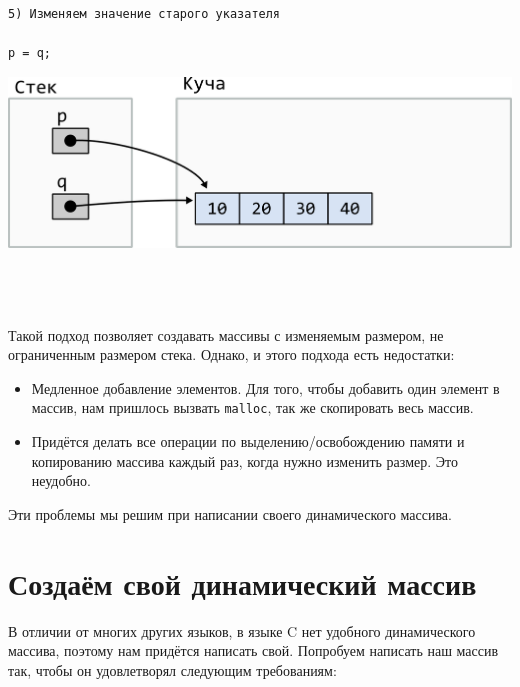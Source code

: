 \documentclass{article}
\begin{document}
\noindent\begin{minipage}{.45\textwidth}
\begin{lstlisting}
5) Изменяем значение старого указателя

p = q;
\end{lstlisting}
\end{minipage}
\begin{minipage}{.45\textwidth}
\includegraphics[scale=0.75]{../images/malloc_realocation5.png}
\end{minipage}
\quad\\
\quad\\
\quad\\

Такой подход позволяет создавать массивы с изменяемым размером, не ограниченным размером стека.
Однако, и этого подхода есть недостатки:
\begin{itemize}
\item Медленное добавление элементов. Для того, чтобы добавить один элемент в массив, нам пришлось вызвать \texttt{malloc}, так же скопировать весь массив.
\item Придётся делать все операции по выделению/освобождению памяти и копированию массива каждый раз, когда нужно изменить размер. Это неудобно.
\end{itemize}
Эти проблемы мы решим при написании своего динамического массива.

\newpage
\section*{Создаём свой динамический массив}

В отличии от многих других языков, в языке C нет удобного динамического массива, поэтому нам придётся написать свой. Попробуем написать наш массив так, чтобы он удовлетворял следующим требованиям:
\end{document}
